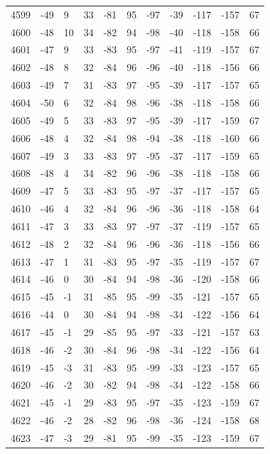 \begin{table}[H]
\begin{tabular}{lllllllllll}
4599 & -49 & 9 & 33 & -81 & 95 & -97 & -39 & -117 & -157 & 67 \\
4600 & -48 & 10 & 34 & -82 & 94 & -98 & -40 & -118 & -158 & 66 \\
4601 & -47 & 9 & 33 & -83 & 95 & -97 & -41 & -119 & -157 & 67 \\
4602 & -48 & 8 & 32 & -84 & 96 & -96 & -40 & -118 & -156 & 66 \\
4603 & -49 & 7 & 31 & -83 & 97 & -95 & -39 & -117 & -157 & 65 \\
4604 & -50 & 6 & 32 & -84 & 98 & -96 & -38 & -118 & -158 & 66 \\
4605 & -49 & 5 & 33 & -83 & 97 & -95 & -39 & -117 & -159 & 67 \\
4606 & -48 & 4 & 32 & -84 & 98 & -94 & -38 & -118 & -160 & 66 \\
4607 & -49 & 3 & 33 & -83 & 97 & -95 & -37 & -117 & -159 & 65 \\
4608 & -48 & 4 & 34 & -82 & 96 & -96 & -38 & -118 & -158 & 66 \\
4609 & -47 & 5 & 33 & -83 & 95 & -97 & -37 & -117 & -157 & 65 \\
4610 & -46 & 4 & 32 & -84 & 96 & -96 & -36 & -118 & -158 & 64 \\
4611 & -47 & 3 & 33 & -83 & 97 & -97 & -37 & -119 & -157 & 65 \\
4612 & -48 & 2 & 32 & -84 & 96 & -96 & -36 & -118 & -156 & 66 \\
4613 & -47 & 1 & 31 & -83 & 95 & -97 & -35 & -119 & -157 & 67 \\
4614 & -46 & 0 & 30 & -84 & 94 & -98 & -36 & -120 & -158 & 66 \\
4615 & -45 & -1 & 31 & -85 & 95 & -99 & -35 & -121 & -157 & 65 \\
4616 & -44 & 0 & 30 & -84 & 94 & -98 & -34 & -122 & -156 & 64 \\
4617 & -45 & -1 & 29 & -85 & 95 & -97 & -33 & -121 & -157 & 63 \\
4618 & -46 & -2 & 30 & -84 & 96 & -98 & -34 & -122 & -156 & 64 \\
4619 & -45 & -3 & 31 & -83 & 95 & -99 & -33 & -123 & -157 & 65 \\
4620 & -46 & -2 & 30 & -82 & 94 & -98 & -34 & -122 & -158 & 66 \\
4621 & -45 & -1 & 29 & -83 & 95 & -97 & -35 & -123 & -159 & 67 \\
4622 & -46 & -2 & 28 & -82 & 96 & -98 & -36 & -124 & -158 & 68 \\
4623 & -47 & -3 & 29 & -81 & 95 & -99 & -35 & -123 & -159 & 67 \\

\end{tabular}
\end{table}
